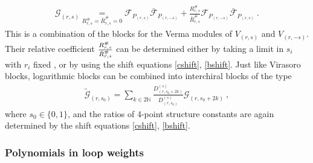\documentclass[12pt, a4paper]{article}
\theoremstyle{break}
\begin{document}
\begin{align}
 \mathcal{G}_{(r,s)} \underset{R^{\#}_{r,s}=\bar R^{\#}_{r,s}=0}{=} 
 \mathcal{F}_{P_{(r,s)}}  \bar{\mathcal{F}}_{P_{(r,-s)}} + 
 \frac{R^{\#}_{r,s}}{\bar{R}^{\#}_{r,s}} \mathcal{F}_{P_{(r,-s)}} \bar{\mathcal{F}}_{P_{(r,s)}} \ .
\end{align}
This is a combination of the blocks for the Verma modules of $V_{(r,s)}$ and $V_{(r,-s)}$. Their relative coefficient $\frac{R^{\#}_{r,s}}{\vphantom{\tilde{|}}\bar{R}^{\#}_{r,s}}$ can be determined either by taking a limit in $s_i$ with $r_i$ fixed \cite{gnjrs21}, or by using the shift equations \eqref{cshift}, \eqref{bshift}. 
Just like Virasoro blocks, logarithmic blocks can be combined into interchiral blocks of the type 
\begin{align}
 \widetilde{\mathcal{G}}_{(r,s_0)} = \sum_{k\in 2\mathbb{N}} \frac{D^{(s)}_{(r,s_0+2k)}}{D^{(s)}_{(r,s_0)}} \mathcal{G}_{(r,s_0+2k)}\ , 
\end{align}
where $s_0\in \{0,1\}$, and the ratios of 4-point structure constants are again determined by the shift equations \eqref{cshift}, \eqref{bshift}. 

\subsubsection{Polynomials in loop weights}\label{sec:plw}
\end{document}

